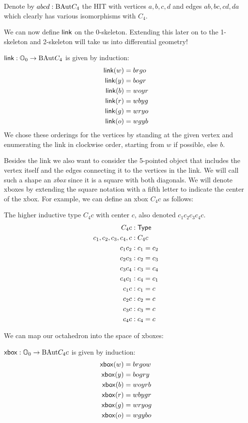 Denote by \( abcd:\mathrm{BAut} C_4 \) the HIT with vertices \( a, b, c, d \) and edges \( ab, bc, cd, da \) which clearly has various isomorphisms with \( C_4 \).

We can now define \( \mathsf{link} \) on the 0-skeleton. Extending this later on to the 1-skeleton and 2-skeleton will take us into differential geometry!

\begin{mydef}
\( \mathsf{link}:\mathbb{O}_0\to\mathrm{BAut} C_4 \) is given by induction:
\begin{align*}
\mathsf{link}(w) &= brgo \\
\mathsf{link}(y) &= bogr \\
\mathsf{link}(b) &= woyr \\
\mathsf{link}(r) &= wbyg \\
\mathsf{link}(g) &= wryo \\
\mathsf{link}(o) &= wgyb
\end{align*}
We chose these orderings for the vertices by standing at the given vertex and enumerating the link in clockwise order, starting from \( w \) if possible, else \( b \).
\end{mydef}

Besides the link we also want to consider the 5-pointed object that includes the vertex itself and the edges connecting it to the vertices in the link. We will call such a shape an \emph{xbox} since it is a square with both diagonals. We will denote xboxes by extending the square notation with a fifth letter to indicate the center of the xbox. For example, we can define an xbox \( C_4c \) as follows:

\begin{mydef}
The higher inductive type \( C_4c \) with center \( c \), also denoted \( c_1c_2c_3c_4c \).
\begin{align*}
C_4c &: \mathsf{Type} \\
c_1, c_2, c_3, c_4, c &: C_4c \\
c_1c_2 &: c_1 = c_2 \\
c_2c_3 &: c_2 = c_3 \\
c_3c_4 &: c_3 = c_4 \\
c_4c_1 &: c_4 = c_1 \\
c_1c &: c_1 = c \\
c_2c &: c_2 = c \\
c_3c &: c_3 = c \\
c_4c &: c_4 = c 
\end{align*}
\end{mydef}

We can map our octahedron into the space of xboxes:
\begin{mydef}
\( \mathsf{xbox}:\mathbb{O}_0\to\mathrm{BAut} C_4c \) is given by induction:
\begin{align*}
\mathsf{xbox}(w) &= brgow \\
\mathsf{xbox}(y) &= bogry \\
\mathsf{xbox}(b) &= woyrb \\
\mathsf{xbox}(r) &= wbygr \\
\mathsf{xbox}(g) &= wryog \\
\mathsf{xbox}(o) &= wgybo
\end{align*}
\end{mydef}

